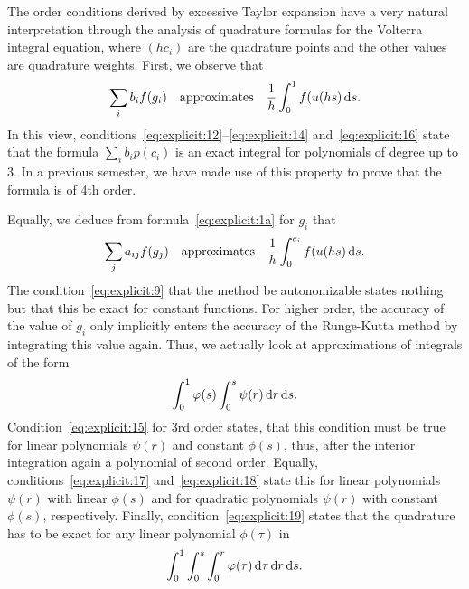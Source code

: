 \begin{remark}
  The order conditions derived by excessive Taylor expansion have a
  very natural interpretation through the analysis of quadrature
  formulas for the Volterra integral equation, where $(h c_i)$ are the
  quadrature points and the other values are quadrature weights.
  First, we observe that
  \begin{gather*}
    \sum_i b_i f(g_i) \quad\text{approximates}\quad
    \frac1h\int_0^1 f(u(h s)\,\mathrm{d} s.
  \end{gather*}
  In this view,
  conditions~\eqref{eq:explicit:12}--\eqref{eq:explicit:14}
  and~\eqref{eq:explicit:16} state that the formula $\sum_i b_i
  p(c_i)$ is an exact integral for polynomials of degree up to 3. In a
  previous semester, we have made use of this property to prove that
  the formula is of 4th order.

  Equally, we deduce from formula~\eqref{eq:explicit:1a} for $g_i$ that
  \begin{gather*}
    \sum_j a_{ij} f(g_j) \quad\text{approximates}\quad
    \frac1h\int_0^{c_i} f(u(h s)\,\mathrm{d} s.
  \end{gather*}
  The condition~\eqref{eq:explicit:9} that the method be autonomizable
  states nothing but that this be exact for constant functions. For
  higher order, the accuracy of the value of $g_i$ only implicitly
  enters the accuracy of the Runge-Kutta method by integrating this
  value again. Thus, we actually look at approximations of integrals
  of the form
  \begin{gather*}
    \int_0^1 \varphi(s) \int_0^s \psi(r) \,\mathrm{d} r\,\mathrm{d} s.
  \end{gather*}
  Condition~\eqref{eq:explicit:15} for 3rd order states, that this
  condition must be true for linear polynomials $\psi(r)$ and constant
  $\phi(s)$, thus, after the interior integration again a polynomial
  of second order. Equally, conditions~\eqref{eq:explicit:17}
  and~\eqref{eq:explicit:18} state this for linear polynomials
  $\psi(r)$ with linear $\phi(s)$ and for quadratic polynomials
  $\psi(r)$ with constant $\phi(s)$, respectively. Finally,
  condition~\eqref{eq:explicit:19} states that the quadrature has to
  be exact for any linear polynomial $\phi(\tau)$ in
  \begin{gather*}
    \int_0^1 \int_0^s \int_0^r \varphi(\tau) \,\mathrm{d} \tau\,\mathrm{d} r\,\mathrm{d} s.
  \end{gather*}
\end{remark}


